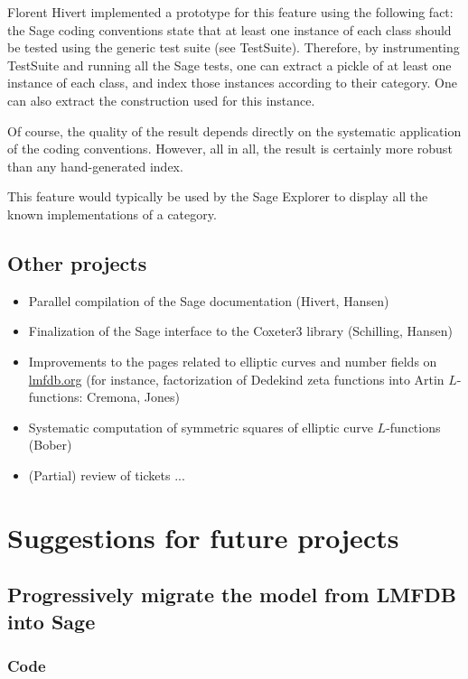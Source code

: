 \documentclass{article}
\begin{document}
Florent Hivert implemented a prototype for this feature using the
following fact: the Sage coding conventions state that at least one
instance of each class should be tested using the generic test suite
(see TestSuite). Therefore, by instrumenting TestSuite and running all
the Sage tests, one can extract a pickle of at least one instance of
each class, and index those instances according to their category.
One can also extract the construction used for this instance.

Of course, the quality of the result depends directly on the
systematic application of the coding conventions. However, all in all,
the result is certainly more robust than any hand-generated index.

This feature would typically be used by the Sage Explorer to display
all the known implementations of a category.


\subsection{Other projects}

\begin{itemize}
\item Parallel compilation of the Sage documentation (Hivert, Hansen)
\item Finalization of the Sage interface to the Coxeter3 library
  (Schilling, Hansen)
\item Improvements to the pages related to elliptic curves and number fields on \url{lmfdb.org} (for instance, factorization of Dedekind zeta functions into Artin $L$-functions: Cremona, Jones)
\item Systematic computation of symmetric squares of elliptic curve $L$-functions (Bober)
\item (Partial) review of tickets ...
\end{itemize}

\section{Suggestions for future projects}

\subsection{Progressively migrate the model from LMFDB into Sage}

\subsubsection{Code}
\end{document}
